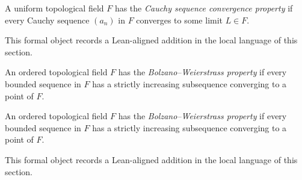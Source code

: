 \begin{remark*}
A uniform topological field $F$ has the \emph{Cauchy sequence convergence property} if every Cauchy sequence $(a_n)$ in $F$ converges to some limit $L\in F$.
\end{remark*}

\begin{remark*}[Interpretation]
This formal object records a Lean-aligned addition in the local language of this section.
\end{remark*}

\begin{dependencies}
\NoLocalDependencies
\end{dependencies}
\begin{definition}
\label{def:bolzano-weierstrass-property}
An ordered topological field $F$ has the \emph{Bolzano--Weierstrass property} if every bounded sequence in $F$ has a strictly increasing subsequence converging to a point of $F$.
\end{definition}

\begin{remark*}
An ordered topological field $F$ has the \emph{Bolzano--Weierstrass property} if every bounded sequence in $F$ has a strictly increasing subsequence converging to a point of $F$.
\end{remark*}

\begin{remark*}[Interpretation]
This formal object records a Lean-aligned addition in the local language of this section.
\end{remark*}

\begin{dependencies}
\NoLocalDependencies
\end{dependencies}
